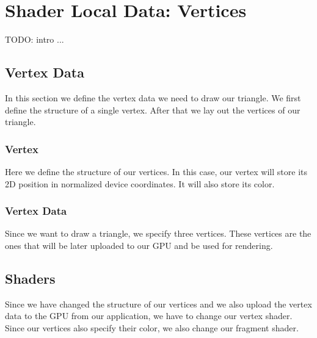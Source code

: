 \chapter{Shader Local Data: Vertices}

TODO: intro ...

\section{Vertex Data}

In this section we define the vertex data we need to draw our triangle.
We first define the structure of a single vertex.
After that we lay out the vertices of our triangle.

\subsection{Vertex}

Here we define the structure of our vertices.
In this case, our vertex will store its 2D position in normalized device coordinates.
It will also store its color.

\begin{minipage}{\linewidth}{\noindent}
    
\end{minipage}

\subsection{Vertex Data}

Since we want to draw a triangle, we specify three vertices.
These vertices are the ones that will be later uploaded to our GPU and be used
for rendering.

\begin{minipage}{\linewidth}{\noindent}
    
\end{minipage}

\section{Shaders}

Since we have changed the structure of our vertices and we also
upload the vertex data to the GPU from our application,
we have to change our vertex shader.
Since our vertices also specify their color, we also change our fragment shader.

